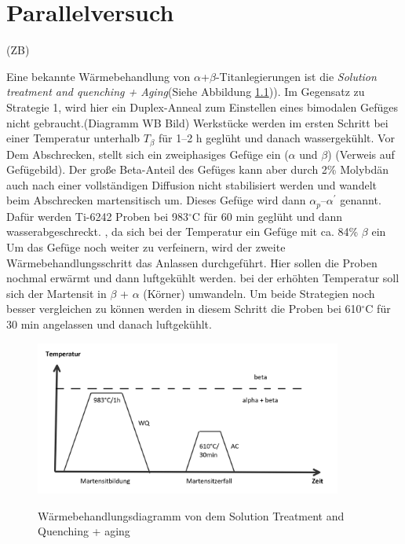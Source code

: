 \chapter{Parallelversuch}

(ZB)

Eine bekannte Wärmebehandlung von $\alpha$+$\beta$-Titanlegierungen ist die  \textit{Solution treatment and quenching + Aging}(Siehe Abbildung \ref{fig:SQ})). Im Gegensatz zu  Strategie 1, wird hier ein Duplex-Anneal zum Einstellen eines bimodalen Gefüges nicht gebraucht.(Diagramm WB Bild)  Werkstücke werden im ersten Schritt bei einer Temperatur unterhalb $T_{\beta}$ für 1--2 h geglüht und danach wassergekühlt. Vor Dem Abschrecken, stellt sich ein zweiphasiges Gefüge ein ($\alpha$ und $\beta$) (Verweis auf Gefügebild). Der große Beta-Anteil des Gefüges kann aber durch 2\% Molybdän auch nach einer vollständigen Diffusion nicht stabilisiert werden und wandelt beim Abschrecken martensitisch um. Dieses Gefüge wird dann $\alpha_p$--$\alpha^\prime$ genannt.
Dafür werden Ti-6242 Proben bei 983$^\circ$C für 60 min geglüht und dann wasserabgeschreckt. , da sich bei der Temperatur ein Gefüge mit ca. 84\% $\beta$ ein
Um das Gefüge noch weiter zu verfeinern, wird der zweite Wärmebehandlungsschritt das Anlassen durchgeführt. Hier sollen die Proben nochmal erwärmt  und dann luftgekühlt werden. bei der erhöhten Temperatur soll sich der Martensit in $\beta$ + $\alpha$ (Körner) umwandeln.
Um beide Strategien noch besser vergleichen zu können werden in diesem Schritt  die Proben bei  610$^\circ$C  für 30 min angelassen und danach luftgekühlt.

\begin{figure}[H]
	\centering
	
	{\includegraphics[width=0.9\textwidth]{./Bilder/SQ.png}}
	\caption{Wärmebehandlungsdiagramm von dem Solution Treatment and Quenching + aging}
	\label{fig:SQ}
\end{figure}


